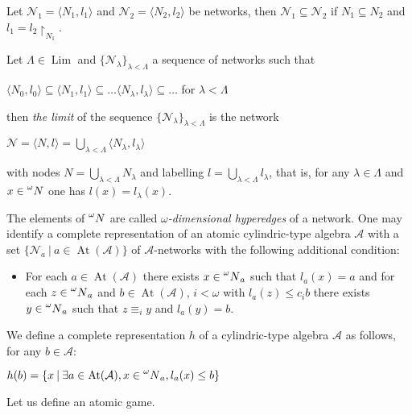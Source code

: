 \documentclass[a4paper]{article}
\theoremstyle{defin}
\theoremstyle{theorem}
\theoremstyle{prop}
\theoremstyle{lemma}
\theoremstyle{fact}
\theoremstyle{ex}
\theoremstyle{col}
\begin{document}
Let $\mathcal{N}_1 = \langle N_1, l_1 \rangle$ and $\mathcal{N}_2 = \langle N_2, l_2 \rangle$ be networks, then $\mathcal{N}_1 \subseteq \mathcal{N}_2$ if $N_1 \subseteq N_2$ and $l_1 = l_2 	\upharpoonright_{N_1}$.

Let $\Lambda \in \operatorname{Lim}$ and $\{ \mathcal{N}_{\lambda}\}_{\lambda < \Lambda}$ a sequence of networks such that
\begin{center}
  $\langle N_0, l_0 \rangle \subseteq \langle N_1, l_1 \rangle \subseteq \dots \langle N_{\lambda}, l_{\lambda} \rangle \subseteq \dots $ for $\lambda < \Lambda$
\end{center}
then \emph{the limit} of the sequence $\{ \mathcal{N}_{\lambda}\}_{\lambda < \Lambda}$ is the network
\begin{center}
  $\mathcal{N} = \langle N, l \rangle = \bigcup \limits_{\lambda < \Lambda} \langle N_{\lambda}, l_{\lambda} \rangle$
\end{center}
with nodes $N = \bigcup \limits_{\lambda < \Lambda} N_{\lambda}$ and labelling $l = \bigcup \limits_{\lambda < \Lambda} l_{\lambda}$, that is,
  for any $\lambda \in \Lambda$ and $x \in \prescript{\omega}{}N$ one has $l(x) = l_{\lambda}(x)$.

The elements of $\prescript{\omega}{}N$ are called \emph{$\omega$-dimensional hyperedges} of a network. One may identify a complete representation of an atomic cylindric-type algebra $\mathcal{A}$
with a set $\{ \mathcal{N}_a \: | \: a \in \operatorname{At}(\mathcal{A}) \}$ of $\mathcal{A}$-networks with the following additional condition:
\begin{itemize}
  \item For each $a \in \operatorname{At}(\mathcal{A})$ there exists $x \in \prescript{\omega}{}N_a$ such that $l_a(x) = a$ and for each $z \in \prescript{\omega}{}N_a$ and $b \in \operatorname{At}(\mathcal{A})$, $i < \omega$ with $l_a(z) \leq c_i b$
  there exists $y \in \prescript{\omega}{}N_a$ such that $z \equiv_i y$ and $l_a(y) = b$.
\end{itemize}

We define a complete representation $h$ of a cylindric-type algebra $\mathcal{A}$ as follows, for any $b \in \mathcal{A}$:
\begin{center}
$h(b) = \{ x \: | \: \exists a \in \operatorname{At}(\mathcal{A}), x \in \prescript{\omega}{}N_a, l_a(x) \leq b \}$
\end{center}

Let us define an atomic game.
\end{document}
